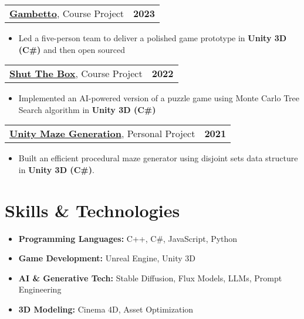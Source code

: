 \documentclass[10pt, letterpaper]{article}
\newenvironment{highlights}{
    \begin{itemize}[topsep=0cm, parsep=0.05cm, itemsep=0.05cm, leftmargin=1.0cm]
}{
    \end{itemize}
}
\begin{document}
\vspace{0.15cm}

\begin{tabularx}{\textwidth}{@{}Xr@{}}
    \textbf{\href{https://github.com/martinopiaggi/gambetto}{Gambetto}}, Course Project & \textbf{2023}
\end{tabularx}

\begin{highlights}
    \item Led a five-person team to deliver a polished game prototype in \textbf{Unity 3D (C\#)} and then open sourced
\end{highlights}

\vspace{0.15cm}

\begin{tabularx}{\textwidth}{@{}Xr@{}}
    \textbf{\href{https://github.com/martinopiaggi/ShutTheBox}{Shut The Box}}, Course Project & \textbf{2022}
\end{tabularx}

\begin{highlights}
    \item Implemented an AI-powered version of a puzzle game using Monte Carlo Tree Search algorithm in \textbf{Unity 3D (C\#)}
\end{highlights}

\vspace{0.15cm}

\begin{tabularx}{\textwidth}{@{}Xr@{}}
    \textbf{\href{https://github.com/martinopiaggi/Unity-Maze-generation-using-disjoint-sets}{Unity Maze Generation}}, Personal Project & \textbf{2021}
\end{tabularx}

\begin{highlights}
    \item Built an efficient procedural maze generator using disjoint sets data structure in \textbf{Unity 3D (C\#)}.
\end{highlights}


\section{Skills \& Technologies}

\begin{highlights}
    \item \textbf{Programming Languages:} C++, C\#, JavaScript, Python
    \item \textbf{Game Development:} Unreal Engine, Unity 3D
    \item \textbf{AI \& Generative Tech:} Stable Diffusion, Flux Models, LLMs, Prompt Engineering
    \item \textbf{3D Modeling:} Cinema 4D, Asset Optimization
\end{highlights}
\end{document}
